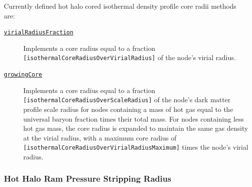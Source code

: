 Currently defined hot halo cored isothermal density profile core radii methods are:
\begin{description}
 \item [\hyperlink{hot_halo.density_profile.cored_isothermal.core_radius.virial_radius_fraction.F90:hot_halo_density_cored_isothermal_core_radii_virial_fraction:hot_halo_density_cored_isothermal_core_radius_virial_fraction}{{\tt virialRadiusFraction}}] Implements a core radius equal to a fraction {\tt [isothermalCoreRadiusOverVirialRadius]} of the node's virial radius.
 \item [\hyperlink{hot_halo.density_profile.cored_isothermal.core_radius.growing_core.F90:hot_halo_density_cored_isothermal_core_radii_growing_core:hot_halo_density_cored_isothermal_core_radius_growing_core}{{\tt growingCore}}] Implements a core radius equal to a fraction {\tt [isothermalCoreRadiusOverScaleRadius]} of the node's dark matter profile scale radius for nodes containing a mass of hot gas equal to the universal baryon fraction times their total mass. For nodes containing less hot gas mass, the core radius is expanded to maintain the same gas density at the virial radius, with a maximum core radius of {\tt [isothermalCoreRadiusOverVirialRadiusMaximum]} times the node's virial radius.
\end{description}

\subsubsection{Hot Halo Ram Pressure Stripping Radius}


